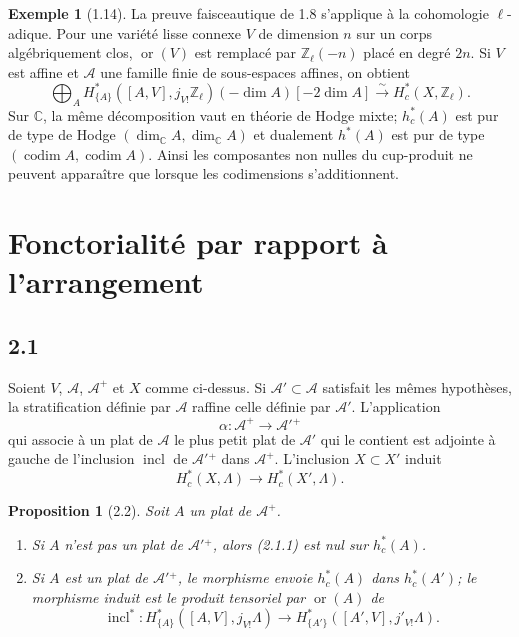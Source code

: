 \documentclass[11pt]{article}
\newtheorem{proposition}[theorem]{Proposition}
\theoremstyle{definition}
\newtheorem{example}[theorem]{Exemple}
\newcommand{\ZZ}{\mathbb Z}
\newcommand{\CC}{\mathbb C}
\newcommand{\codim}{\operatorname{codim}}
\newcommand{\ornt}{\operatorname{or}}
\newcommand{\incl}{\operatorname{incl}}
\begin{document}
\begin{example}[1.14]
La preuve faisceautique de 1.8 s'applique à la cohomologie $\ell$-adique. Pour une variété lisse connexe $V$ de dimension $n$ sur un corps algébriquement clos, $\ornt(V)$ est remplacé par $\ZZ_\ell(-n)$ placé en degré $2n$. Si $V$ est affine et $\mathcal A$ une famille finie de sous-espaces affines, on obtient
\begin{equation}
\bigoplus_A H^*_{\{A\}}([A,V],j_{V!}\ZZ_\ell)(-\dim A)[-2\dim A]
\xrightarrow{\sim}H_c^*(X,\ZZ_\ell).\tag{1.14.1}
\end{equation}
Sur $\CC$, la même décomposition vaut en théorie de Hodge mixte; $h_c^*(A)$ est pur de type de Hodge $(\dim_\CC A,\dim_\CC A)$ et dualement $h^*(A)$ est pur de type $(\codim A,\codim A)$. Ainsi les composantes non nulles du cup-produit ne peuvent apparaître que lorsque les codimensions s'additionnent.
\end{example}

\section{Fonctorialité par rapport à l'arrangement}

\subsection*{2.1}
Soient $V$, $\mathcal A$, $\mathcal A^+$ et $X$ comme ci-dessus. Si $\mathcal A'\subset\mathcal A$ satisfait les mêmes hypothèses, la stratification définie par $\mathcal A$ raffine celle définie par $\mathcal A'$. L'application
\[
\alpha:\mathcal A^+\longrightarrow\mathcal A'{}^+
\]
qui associe à un plat de $\mathcal A$ le plus petit plat de $\mathcal A'$ qui le contient est adjointe à gauche de l'inclusion $\incl$ de $\mathcal A'{}^+$ dans $\mathcal A^+$. L'inclusion $X\subset X'$ induit
\begin{equation}
H_c^*(X,\Lambda)\longrightarrow H_c^*(X',\Lambda).\tag{2.1.1}
\end{equation}

\begin{proposition}[2.2]
Soit $A$ un plat de $\mathcal A^+$.
\begin{enumerate}[label=(\roman*)]
\item Si $A$ n'est pas un plat de $\mathcal A'{}^+$, alors (2.1.1) est nul sur $h_c^*(A)$.
\item Si $A$ est un plat de $\mathcal A'{}^+$, le morphisme envoie $h_c^*(A)$ dans $h_c^*(A')$; le morphisme induit est le produit tensoriel par $\ornt(A)$ de
\begin{equation}
\incl^*:H^*_{\{A\}}([A,V],j_{V!}\Lambda)\longrightarrow H^*_{\{A'\}}([A',V],j'_{V!}\Lambda).\tag{2.2.1}
\end{equation}
\end{enumerate}
\end{proposition}
\end{document}

